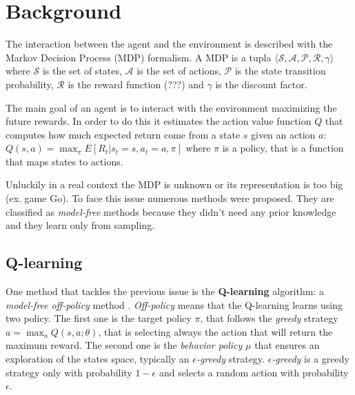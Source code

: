 \section{Background}


The interaction between the agent and the environment is described  with the
Markov Decision Process (MDP) formalism. A MDP is a tupla $\langle \mathcal{S}, 
\mathcal{A}, \mathcal{P}, \mathcal{R}, \gamma \rangle$ where $\mathcal{S}$ is
the set of states, $\mathcal{A}$ is the set of actions, $\mathcal{P}$ is the 
state transition probability, $\mathcal{R}$ is the reward function (???) and 
$\gamma$ is the discount factor.

The main goal of an agent is to interact with the environment maximizing the future rewards. In order to do this it estimates the action value function $Q$ that computes how much expected return come from a state $s$ given an action $a$: $Q(s, a) = \max_\pi E[R_t | s_t = s, a_t = a, \pi]$ where $\pi$ is a policy, that is a function that maps states to actions.


Unluckily in a real context the MDP is unknown or its representation is too big
(ex. game Go). To face this issue numerous methods were proposed. They are 
classified as \textit{model-free} methods because they didn't need any prior knowledge and they learn only from sampling.


\subsection{Q-learning}

One method that tackles the previous issue is the \textbf{Q-learning} algorithm: a \textit{model-free} \textit{off-policy} method \cite{Watkins1992}. 
\textit{Off-policy} means that the Q-learning learns using two policy. The first one is the target policy $\pi$, that follows the \textit{greedy} strategy $a = \max_a Q(s, a; \theta)$, that is selecting always the action that will return the maximum reward.
The second one is the \textit{behavior policy} $\mu$ that ensures an exploration of the states space, typically an \textit{$\epsilon$-greedy} strategy. \textit{$\epsilon$-greedy} is a greedy strategy only with probability $1 - \epsilon$ and selects a random action with probability $\epsilon$.

